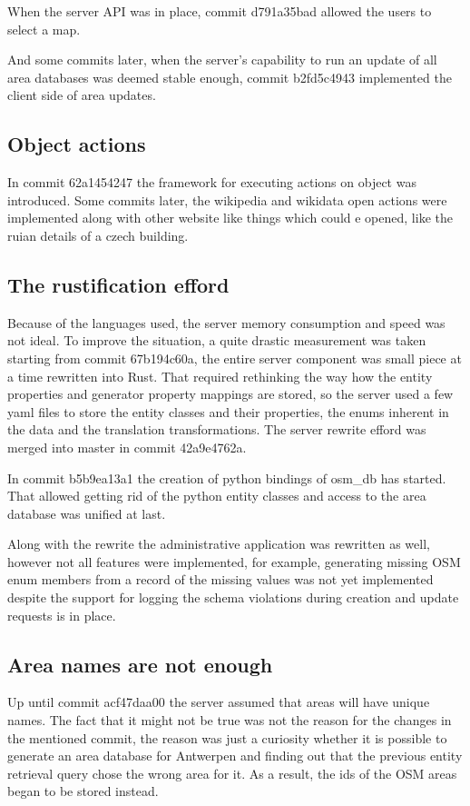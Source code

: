 \documentclass[nolof,digital]{fithesis3}
\begin{document}
When the server API was in place, commit d791a35bad allowed the users to select a map. 

And some commits later, when the server's capability to run an update of all area databases was deemed stable enough, commit b2fd5c4943 implemented the client side of area updates.
\subsection{Object actions}
In commit 62a1454247 the framework for executing actions on object was introduced. Some commits later, the wikipedia and wikidata open actions were implemented along with other website like things which could e opened, like the ruian details of a czech building.
\subsection{The rustification efford}
Because of the languages used, the server memory consumption and speed was not ideal. To improve the situation, a quite drastic measurement was taken starting from commit 67b194c60a, the entire server component was small piece at a time rewritten into Rust. That required rethinking the way how the entity properties and generator property mappings are stored, so the server used a few yaml files to store the entity classes and their properties, the enums inherent in the data and the translation transformations. The server rewrite efford was merged into master in commit 42a9e4762a.

In commit b5b9ea13a1 the creation of python bindings of osm_db has started. That allowed getting rid of the python entity classes and access to the area database was unified at last.

Along with the rewrite the administrative application was rewritten as well, however not all features were implemented, for example, generating missing OSM enum members from a record of the missing values was not yet implemented despite the support for logging the schema violations during creation and update requests is in place.
\subsection{Area names are not enough}
Up until commit acf47daa00 the server assumed that areas will have unique names. The fact that it might not be true was not the reason for the changes in the mentioned commit, the reason was just a curiosity whether it is possible to generate an area database for Antwerpen and finding out that the previous entity retrieval query chose the wrong area for it. As a result, the ids of the OSM areas began to be stored instead.
\end{document}
